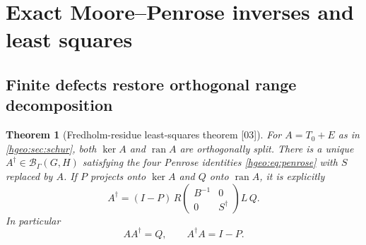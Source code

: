 \documentclass[11pt,letterpaper]{article}
\numberwithin{equation}{section}
\newtheorem{theorem}{Theorem}[section]
\theoremstyle{definition}
\theoremstyle{remark}
\newcommand{\BB}[2]{\mathscr B_\Gamma(#1,#2)}
\newcommand{\ran}{\operatorname{ran}}
\newcommand{\src}[1]{\textup{\textsf{\small[#1]}}}
\begin{document}
\section{Exact Moore--Penrose inverses and least squares}
\label{hgeo:sec:least}

\subsection{Finite defects restore orthogonal range decomposition}

\begin{theorem}[Fredholm-residue least-squares theorem \src{03}]
\label{hgeo:thm:MP}
For $A=T_0+E$ as in \cref{hgeo:sec:schur}, both $\ker A$ and
$\ran A$ are orthogonally split. There is a unique
$A^\dagger\in\BB{G}{H}$ satisfying the four Penrose identities
\eqref{hgeo:eq:penrose} with $S$ replaced by $A$.
If $P$ projects onto $\ker A$ and $Q$ onto $\ran A$, it is explicitly
\begin{equation}\label{hgeo:eq:MPformula}
 A^\dagger=(I-P)\,
 R\begin{pmatrix}B^{-1}&0\\0&S^\dagger\end{pmatrix}L\,Q.
\end{equation}
In particular
\begin{equation}\label{hgeo:eq:MPproj}
 AA^\dagger=Q,\qquad A^\dagger A=I-P.
\end{equation}
\end{theorem}
\end{document}
